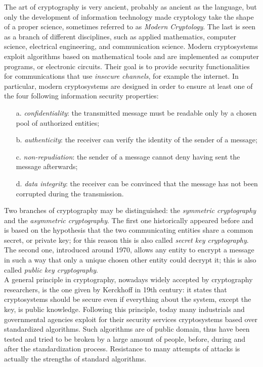 The art of cryptography is very ancient, probably as ancient as the language, but only the development of information technology made cryptology take the shape of a proper science, sometimes referred to as \emph{Modern Cryptology}. The last is seen as a branch of different disciplines, such as applied mathematics, computer science, electrical engineering, and communication science. Modern cryptosystems exploit algorithms based on mathematical tools and are implemented as computer programs, or electronic circuits. Their goal is to provide security functionalities for communications that use \emph{insecure channels}, for example the internet. In particular, modern cryptosystems are designed in order to ensure at least one of the four following information security properties:
\begin{itemize}
\item[a.] \emph{confidentiality}: the transmitted message must be readable only by a chosen pool of authorized entities;
\item[b.] \emph{authenticity}: the receiver can verify the identity of the sender of a message;
\item[c.] \emph{non-repudiation}: the sender of a message cannot deny having sent the message afterwards;
\item[d.] \emph{data integrity}: the receiver can be convinced that the message has not been corrupted during the transmission.


\end{itemize} 

Two branches of cryptography may be distinguished: the \emph{symmetric cryptography} and the \emph{asymmetric cryptography}. The first one historically appeared before and is based on the hypothesis that the two communicating entities share a common secret, or private key; for this reason this is also called \emph{secret key cryptography}. The second one, introduced around 1970, allows any entity to encrypt a message in such a way that only a unique chosen other entity could decrypt it; this is also called \emph{public key cryptography}. \\

A general principle in cryptography, nowadays widely accepted by cryptography researchers, is the one given by Kerckhoff in 19th century: it states that cryptosystems should be secure even if everything about the system, except the key, is public knowledge. Following this principle, today many industrials and governmental agencies exploit for their security services cryptosystems based over standardized algorithms. Such algorithms are of public domain, thus have been tested and tried to be broken by a large amount of people, before, during and after the standardization process. Resistance to many attempts of attacks is actually the strengths of standard algorithms.\\

